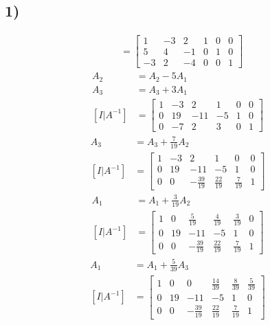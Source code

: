 \documentclass{article}
\begin{document}
\subsection{1)}
\begin{align*}
	[I|A^{-1}] & = \left[ \begin{array}{ccc|ccc}
		1 & -3 & 2 & 1 & 0 & 0 \\
		5 & 4 & -1 & 0 & 1 & 0 \\
		-3 & 2 & -4 & 0 & 0 & 1
	\end{array} \right]
\end{align*}
\begin{align*}
	A_2 & = A_2 - 5A_1 \\
	A_3 & = A_3 + 3A_1 \\
	[I|A^{-1}] & = \left[ \begin{array}{ccc|ccc}
		1 & -3 & 2 & 1 & 0 & 0 \\
		0 & 19 & -11 & -5 & 1 & 0 \\
		0 & -7 & 2 & 3 & 0 & 1
	\end{array} \right]
\end{align*}
\begin{align*}
	A_3 & = A_3 + \frac{7}{19}A_2 \\
	[I|A^{-1}] & = \left[ \begin{array}{ccc|ccc}
		1 & -3 & 2 & 1 & 0 & 0 \\
		0 & 19 & -11 & -5 & 1 & 0 \\
		0 & 0 & -\frac{39}{19} & \frac{22}{19} & \frac{7}{19} & 1
	\end{array} \right]
\end{align*}
\begin{align*}
	A_1 & = A_1 + \frac{3}{19}A_2 \\
	[I|A^{-1}] & = \left[ \begin{array}{ccc|ccc}
		1 & 0 & \frac{5}{19} & \frac{4}{19} & \frac{3}{19} & 0 \\
		0 & 19 & -11 & -5 & 1 & 0 \\
		0 & 0 & -\frac{39}{19} & \frac{22}{19} & \frac{7}{19} & 1
	\end{array} \right]
\end{align*}
\begin{align*}
	A_1 & = A_1 + \frac{5}{39}A_3 \\
	[I|A^{-1}] & = \left[ \begin{array}{ccc|ccc}
		1 & 0 & 0 & \frac{14}{39} & \frac{8}{39} & \frac{5}{39} \\
		0 & 19 & -11 & -5 & 1 & 0 \\
		0 & 0 & -\frac{39}{19} & \frac{22}{19} & \frac{7}{19} & 1
	\end{array} \right]
\end{align*}
\end{document}

